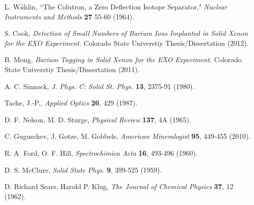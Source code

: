 \documentclass[PhD, copyrightpage]{csuthesis} %
\begin{document}
\begin{thebibliography}{00}
  L. W$\overset{\circ}{a}$hlin, ``The Colutron, a Zero Deflection Isotope Separator," \emph{Nuclear Instruments and Methods} \textbf{27} 55-60 (1964).
 
 
  S. Cook, \emph{Detection of Small Numbers of Barium Ions Implanted in Solid Xenon for the EXO Experiment.}  Colorado State Universtiy Thesis/Dissertation (2012).
 
  B. Mong, \emph{Barium Tagging in Solid Xenon for the EXO Experiment.}  Colorado State Universtiy Thesis/Dissertation (2011).
 
  A. C. Sinnock, \emph{J. Phys. C: Solid St. Phys.} \textbf{13}, 2375-91 (1980).
 
   Tache, J.-P., \emph{Applied Optics} \textbf{26}, 429 (1987).

  D. F. Nelson, M. D. Sturge, \emph{Physical Review} \textbf{137}, 4A (1965).
 
  C. Guguschev, J. Gotze, M. Gobbels, \emph{American Mineralogist} \textbf{95}, 449-455 (2010).
 
  R. A. Ford, O. F. Hill, \emph{Spectrochimica Acta} \textbf{16}, 493-496 (1960).
 
  D. S. McClure, \emph{Solid State Phys.} \textbf{9}, 399-525 (1959).
 
  D. Richard Sears, Harold P. Klug, \emph{The Journal of Chemical Physics} \textbf{37}, 12 (1962).
 
 \end{thebibliography}
% 
\end{document}
